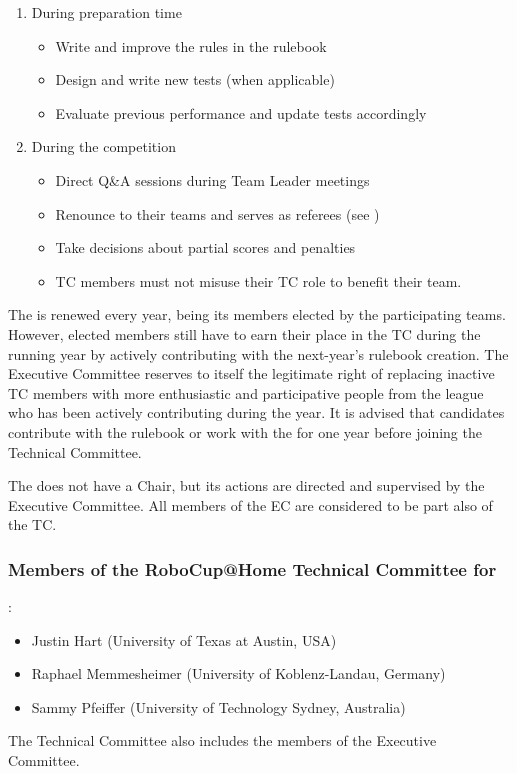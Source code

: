 \begin{enumerate}
  \item During preparation time
  \begin{itemize}
    \item Write and improve the rules in the rulebook
    \item Design and write new tests (when applicable)
    \item Evaluate previous performance and update tests accordingly
  \end{itemize}
  \item During the competition
  \begin{itemize}
    \item Direct Q\&A sessions during Team Leader meetings
    \item Renounce to their teams and serves as referees (see )
    \item Take decisions about partial scores and penalties
    \item TC members must not misuse their TC role to benefit their team.
  \end{itemize}
\end{enumerate}

The  is renewed every year, being its members elected by the participating teams. However, elected members still have to earn their place in the TC during the running year by actively contributing with the next-year's rulebook creation.
The Executive Committee reserves to itself the legitimate right of replacing inactive TC members with more enthusiastic and participative people from the league who has been actively contributing during the year.
It is advised that candidates contribute with the rulebook or work with the  for one year before joining the Technical Committee.

The  does not have a Chair, but its actions are directed and supervised by the Executive Committee. All members of the EC are considered to be part also of the TC.

\subsubsection{Members of the RoboCup@Home Technical Committee for \YEAR}:
\begin{itemize}
  \item Justin Hart (University of Texas at Austin, USA)
  \item Raphael Memmesheimer (University of Koblenz-Landau, Germany)
  \item Sammy Pfeiffer (University of Technology Sydney, Australia)
\end{itemize}
The Technical Committee also includes the members of the Executive Committee.


